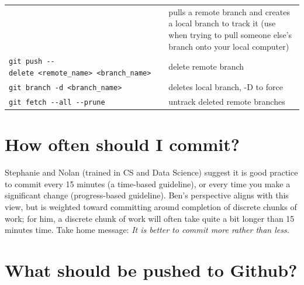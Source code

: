 \documentclass[]{book}
\begin{document}
\begin{longtable}[]{@{}ll@{}}
\begin{minipage}[t]{0.34\columnwidth}
\end{minipage} & \begin{minipage}[t]{0.60\columnwidth}\raggedright
pulls a remote branch and creates a local branch to track it (use when trying to pull someone else's branch onto your local computer)\strut
\end{minipage}\tabularnewline
\begin{minipage}[t]{0.34\columnwidth}\raggedright
\texttt{git\ push\ -\/-delete\ \textless{}remote\_name\textgreater{}\ \textless{}branch\_name\textgreater{}}\strut
\end{minipage} & \begin{minipage}[t]{0.60\columnwidth}\raggedright
delete remote branch\strut
\end{minipage}\tabularnewline
\begin{minipage}[t]{0.34\columnwidth}\raggedright
\texttt{git\ branch\ -d\ \textless{}branch\_name\textgreater{}}\strut
\end{minipage} & \begin{minipage}[t]{0.60\columnwidth}\raggedright
deletes local branch, -D to force\strut
\end{minipage}\tabularnewline
\begin{minipage}[t]{0.34\columnwidth}\raggedright
\texttt{git\ fetch\ -\/-all\ -\/-prune}\strut
\end{minipage} & \begin{minipage}[t]{0.60\columnwidth}\raggedright
untrack deleted remote branches\strut
\end{minipage}\tabularnewline
\bottomrule
\end{longtable}

\hypertarget{how-often-should-i-commit}{%
\section{How often should I commit?}\label{how-often-should-i-commit}}

Stephanie and Nolan (trained in CS and Data Science) suggest it is good practice to commit every 15 minutes (a time-based guideline), or every time you make a significant change (progress-based guideline). Ben's perspective aligns with this view, but is weighted toward committing around completion of discrete chunks of work; for him, a discrete chunk of work will often take quite a bit longer than 15 minutes time. Take home message: \emph{It is better to commit more rather than less.}

\hypertarget{what-should-be-pushed-to-github}{%
\section{What should be pushed to Github?}\label{what-should-be-pushed-to-github}}
\end{document}

